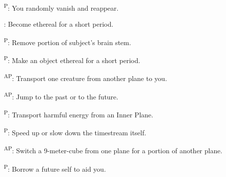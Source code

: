 \begin{enumerate*}
      \textsuperscript{P}: You randomly vanish and reappear.

      : Become ethereal for a short period.

\item {}\textsuperscript{P}: Remove portion of subject's brain stem.

      \textsuperscript{P}: Make an object ethereal for a short period.

      \textsuperscript{AP}: Transport one creature from another plane to you.

      \textsuperscript{AP}: Jump to the past or to the future.

\item {}\textsuperscript{P}: Transport harmful energy from an Inner Plane.

      \textsuperscript{P}: Speed up or slow down the timestream itself.

\item {}\textsuperscript{AP}: Switch a 9-meter-cube from one plane for a portion of another plane.

      \textsuperscript{P}: Borrow a future self to aid you.
\end{enumerate*}



